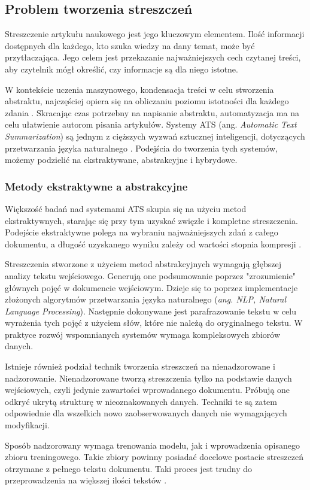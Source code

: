 \documentclass[12pt,a4paper,twoside]{article}
\begin{document}
\subsection{Problem tworzenia streszczeń}
Streszczenie artykułu naukowego jest jego kluczowym elementem. Ilość informacji dostępnych dla każdego, kto szuka wiedzy na dany temat, może być przytłaczająca. Jego celem jest przekazanie najważniejszych cech czytanej treści, aby czytelnik mógł określić, czy informacje są dla niego istotne. \par
W kontekście uczenia maszynowego, kondensacja treści w celu stworzenia abstraktu, najczęściej opiera się na obliczaniu poziomu istotności dla każdego zdania \cite{MUTLU2020102359}. Skracając czas potrzebny na napisanie abstraktu, automatyzacja ma na celu ułatwienie autorom pisania artykułów. Systemy ATS (ang. \textit{Automatic Text Summarization}) są jednym z cięższych wyzwań sztucznej inteligencji, dotyczących przetwarzania języka naturalnego \cite{ELKASSAS2021113679}. Podejścia do tworzenia tych systemów, możemy podzielić na ekstraktywane, abstrakcyjne i hybrydowe. 
\subsubsection{Metody ekstraktywne a abstrakcyjne}
Większość badań nad systemami ATS skupia się na użyciu metod ekstraktywnych, starając się przy tym uzyskać zwięzłe i kompletne streszczenia. Podejście ekstraktywne polega na wybraniu najważniejszych zdań z całego dokumentu, a długość uzyskanego wyniku zależy od wartości stopnia kompresji \cite{Gambhir2017}. \par
Streszczenia stworzone z użyciem metod abstrakcyjnych wymagają głębszej analizy tekstu wejściowego. Generują one podsumowanie poprzez "zrozumienie" głównych pojęć w dokumencie wejściowym. Dzieje się to poprzez implementacje złożonych algorytmów przetwarzania języka naturalnego (\textit{ang. NLP, Natural Language Processing}). Następnie dokonywane jest parafrazowanie tekstu w celu wyrażenia tych pojęć z użyciem słów, które nie należą do oryginalnego tekstu. W praktyce rozwój wspomnianych systemów wymaga kompleksowych zbiorów danych.\par
Istnieje również podział technik tworzenia streszczeń na nienadzorowane i nadzorowanie. Nienadzorowane tworzą streszczenia tylko na podstawie danych wejściowych, czyli jedynie zawartości wprowadanego dokumentu. Próbują one odkryć ukrytą strukturę w nieoznakowanych danych. Techniki te są zatem odpowiednie dla wszelkich nowo zaobserwowanych danych nie wymagających modyfikacji.\par
Sposób nadzorowany wymaga trenowania modelu, jak i wprowadzenia opisanego zbioru treningowego. Takie zbiory powinny posiadać docelowe postacie streszczeń otrzymane z pełnego tekstu dokumentu. Taki proces jest trudny do przeprowadzenia na większej ilości tekstów \cite{ELKASSAS2021113679}.
\end{document}
